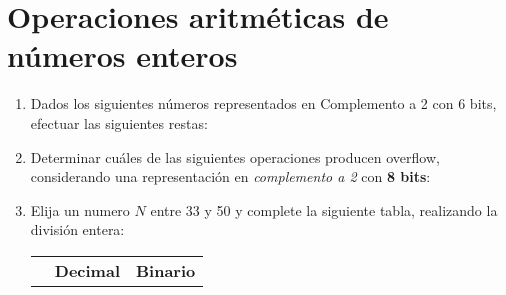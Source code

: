 \documentclass[12pt]{article}
\begin{document}
\section{Operaciones aritméticas de números enteros}

\begin{enumerate}

    \item Dados los siguientes números representados en Complemento a 2 con 6
        bits, efectuar las siguientes restas:
    

    \item Determinar cuáles de las siguientes operaciones producen overflow,
        considerando una representación en \emph{complemento a 2} con
        \textbf{8 bits}:


    \item Elija un numero $N$ entre 33 y 50 y complete la siguiente tabla,
        realizando la división entera:

        \begin{center}

            \begin{tabular}[t]{|c|c|c|}

            \hline

                 & \textbf{Decimal} & \textbf{Binario} \\


\end{tabular}
\end{center}
\end{enumerate}
\end{document}
